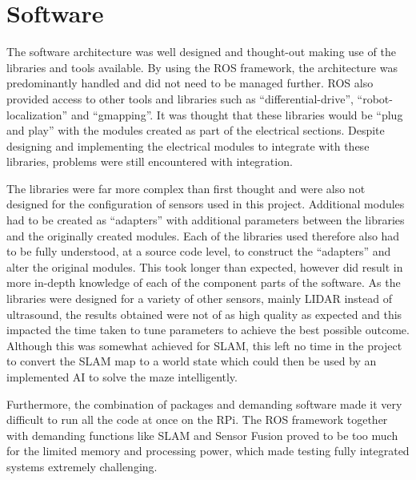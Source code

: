 \section{Software}\label{eval/soft}
The software architecture was well designed and thought-out making use of the
libraries and tools available. By using the ROS framework, the architecture was predominantly handled
and did not need to be managed further. ROS also provided
access to other tools and libraries such as ``differential-drive'', ``robot-
localization'' and ``gmapping''. It was thought that these libraries would be ``plug
and play'' with the modules created as part of the electrical sections. Despite
designing and implementing the electrical modules to integrate with these libraries,
problems were still encountered with integration.

The libraries were far more complex than first thought and were also not designed for
the configuration of sensors used in this project. Additional modules had to be
created as ``adapters'' with additional parameters between the libraries and the
originally created modules. Each of the libraries used therefore also had to be fully
understood, at a source code level, to construct the ``adapters'' and alter
the original modules. This took longer than expected, however did result in more in-depth knowledge of each of the component parts of the software. As the libraries were
designed for a variety of other sensors, mainly LIDAR instead of ultrasound, the
results obtained were not of as high quality as expected and this impacted the time
taken to tune parameters to achieve the best possible outcome. Although this was
somewhat achieved for SLAM, this left no time in the project to convert the SLAM map
to a world state which could then be used by an implemented AI to solve the maze
intelligently.

Furthermore, the combination of packages and demanding software 
made it very difficult to run all the code at once on the RPi. The 
ROS framework together with demanding functions like SLAM and 
Sensor Fusion proved to be too much for the limited memory and 
processing power, which made testing fully integrated systems 
extremely challenging.
